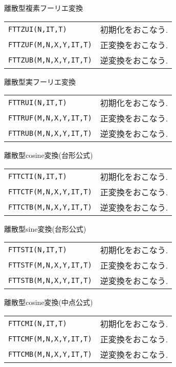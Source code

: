 \documentclass[a4j]{jarticle}
\begin{document}
  離散型複素フーリエ変換

  \vspace{1em}
  \begin{tabular}{p{7cm}p{10cm}}
    {\tt FTTZUI(N,IT,T)} & 初期化をおこなう.\\
    {\tt FTTZUF(M,N,X,Y,IT,T)} & 正変換をおこなう.\\
    {\tt FTTZUB(M,N,X,Y,IT,T)} & 逆変換をおこなう.
  \end{tabular}

 \vspace{1em}
  離散型実フーリエ変換

  \vspace{1em}
  \begin{tabular}{p{7cm}p{10cm}}
    {\tt FTTRUI(N,IT,T)} & 初期化をおこなう.\\
    {\tt FTTRUF(M,N,X,Y,IT,T)} & 正変換をおこなう.\\
    {\tt FTTRUB(M,N,X,Y,IT,T)} & 逆変換をおこなう.
  \end{tabular}
  
 \vspace{1em}
  離散型cosine変換(台形公式)

  \vspace{1em}
  \begin{tabular}{p{7cm}p{10cm}}
    {\tt FTTCTI(N,IT,T)} & 初期化をおこなう. \\
    {\tt FTTCTF(M,N,X,Y,IT,T)} & 正変換をおこなう. \\
    {\tt FTTCTB(M,N,X,Y,IT,T)} & 逆変換をおこなう.
  \end{tabular}

 \vspace{1em}
  離散型sine変換(台形公式)

  \vspace{1em}
  \begin{tabular}{p{7cm}p{10cm}}
    {\tt FTTSTI(N,IT,T)} & 初期化をおこなう. \\
    {\tt FTTSTF(M,N,X,Y,IT,T)} & 正変換をおこなう. \\
    {\tt FTTSTB(M,N,X,Y,IT,T)} & 逆変換をおこなう.
  \end{tabular}

 \vspace{1em}
  離散型cosine変換(中点公式)

  \vspace{1em}
  \begin{tabular}{p{7cm}p{10cm}}
    {\tt FTTCMI(N,IT,T)} & 初期化をおこなう. \\
    {\tt FTTCMF(M,N,X,Y,IT,T)} & 正変換をおこなう. \\
    {\tt FTTCMB(M,N,X,Y,IT,T)} & 逆変換をおこなう.
  \end{tabular}
\end{document}
